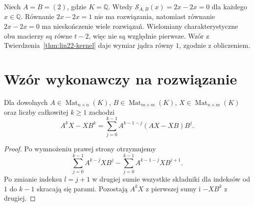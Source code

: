\begin{przyklad}
\label{prz:lin22-obstruction}
Niech \(A=B=(2)\), gdzie \(K=\mathbb Q\).
Wtedy \(\mathcal S_{A,B}(x)=2x-2x=0\)
dla każdego \(x\in\mathbb Q\).
Równanie \(2x-2x=1\)
nie ma rozwiązania,
natomiast równanie
\(2x-2x=0\) ma nieskończenie
wiele rozwiązań.
Wielomiany charakterystyczne
obu macierzy są równe \(t-2\),
więc nie są względnie pierwsze.
Wzór z
Twierdzenia~\ref{thm:lin22-kernel}
daje wymiar jądra równy \(1\),
zgodnie z obliczeniem.
\end{przyklad}

\section{Wzór wykonawczy na rozwiązanie}
\label{sec:lin22-explicit}

\begin{lemat}
\label{lem:lin22-telescope}
Dla dowolnych \(A\in\operatorname{Mat}_{n\times n}(K)\),
\(B\in\operatorname{Mat}_{m\times m}(K)\),
\(X\in\operatorname{Mat}_{n\times m}(K)\)
oraz liczby całkowitej \(k\ge1\)
zachodzi
\[
 A^kX-XB^k
 =\sum_{j=0}^{k-1}
 A^{k-1-j}(AX-XB)B^j.
\]
\end{lemat}
\begin{proof}
Po wymnożeniu prawej strony
otrzymujemy
\[
 \sum_{j=0}^{k-1}A^{k-j}XB^j
 -\sum_{j=0}^{k-1}A^{k-1-j}XB^{j+1}.
\]
Po zmianie indeksu \(l=j+1\)
w drugiej sumie wszystkie składniki
dla indeksów od \(1\) do \(k-1\)
skracają się parami.
Pozostają \(A^kX\) z pierwszej
sumy i \(-XB^k\) z drugiej.
\end{proof}

